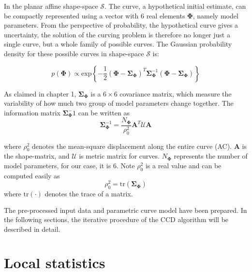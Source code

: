 In the planar affine shape-space $\mathcal{S}$. The curve, a
hypothetical initial estimate, can be compactly represented using a
vector with 6 real elements $\mathbf{\Phi}$, namely model
parameters. From the perspective of probability, the hypothetical
curve gives a uncertainty, the solution of the curving problem is
therefore no longer just a single curve, but a whole family of
possible curves. The Gaussian probability density for these possible
curves in shape-space $\mathcal{S}$ is:

\begin{equation}
  \label{eq:5.1}
   p(\mathbf{\Phi}) \propto
\mathrm{exp} \left\{ -\frac{1}{2} (\mathbf{\Phi} -
  \mathbf{\Sigma}_{\mathbf{\Phi}})^T \mathbf{\Sigma}_{\mathbf{\Phi}}^{-1} (\mathbf{\Phi} -
  \mathbf{\Sigma}_{\mathbf{\Phi}}) \right\}
\end{equation}

As claimed in chapter 1, $\mathbf{\Sigma}_{\mathbf{\Phi}}$ is a $6 \times 6$ 
covariance matrix, which measure the variability of
how much two group of model parameters change together. The
information matrix $\mathbf{\Sigma}_{\mathbf{\Phi}}^-1$ can be
written as 
\begin{equation}
  \label{eq:5.2}
  \mathbf{\Sigma}_{\mathbf{\Phi}}^{-1} = \frac{N_{\mathbf{\Phi}}}{\rho_0^2} \mathbf{A}^T\mathcal{U}\mathbf{A}
\end{equation}

where $\rho_0^2$ denotes the mean-square displacement along the entire
curve (AC). $\mathbf{A}$ is the shape-matrix, and $\mathcal{U}$ is
metric matrix for curves. $N_{\mathbf{\Phi}}$ represents
the number of model parameters, for our case, it is 6. Note $\rho_0^2$
is a real value and can be computed easily as 
\begin{equation}
  \label{eq:5.3}
  \rho_0^2 = \mathrm{tr}(\mathbf{\Sigma}_{\mathbf{\Phi}})
\end{equation}
where $\mathrm{tr}(\cdot)$ denotes the trace of a matrix.

The pre-processed input data and parametric curve model have been
prepared. In the following sections, the iterative procedure of the
CCD algorithm will be described in detail.

\section{Local statistics}
\label{sec:ls}

